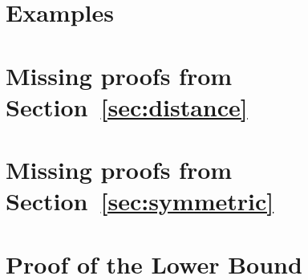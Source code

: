 \documentclass[final,12pt]{colt2018}
\begin{document}
%


\appendix
\section{Examples}
\label{app:sec_examples}


\section{Missing proofs from Section~\ref{sec:distance}}
\label{app:proofs_dist}


\section{Missing proofs from Section~\ref{sec:symmetric}}
\label{app:proofs_symm}


%
%
%
%
%
\section{Proof of the Lower Bound}
\label{app:sec_symm_lb}

%
%
%
%
%
%
\end{document}

